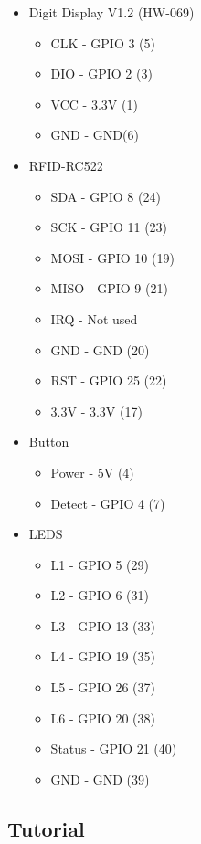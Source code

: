 \documentclass{article}
\begin{document}
\begin{itemize}
    \item Digit Display V1.2 (HW-069)
        \begin{itemize}
            \item CLK - GPIO 3 (5)
            \item DIO - GPIO 2 (3)
            \item VCC - 3.3V (1)
            \item GND - GND(6)
        \end{itemize}
    \item RFID-RC522
        \begin{itemize}
            \item SDA - GPIO 8 (24)
            \item SCK - GPIO 11 (23)
            \item MOSI - GPIO 10 (19)
            \item MISO - GPIO 9 (21)
            \item IRQ - Not used
            \item GND - GND (20)
            \item RST - GPIO 25 (22)
            \item 3.3V - 3.3V (17)
        \end{itemize}
    \item Button
        \begin{itemize}
            \item Power - 5V (4)
            \item Detect - GPIO 4 (7)
        \end{itemize}
    \item LEDS
        \begin{itemize}
            \item L1 - GPIO 5 (29)
            \item L2 - GPIO 6 (31)
            \item L3 - GPIO 13 (33)
            \item L4 - GPIO 19 (35)
            \item L5 - GPIO 26 (37)
            \item L6 - GPIO 20 (38)
            \item Status - GPIO 21 (40)
            \item GND - GND (39)
        \end{itemize}
\end{itemize}
\subsection{Tutorial}

\subsection{}
\end{document}
